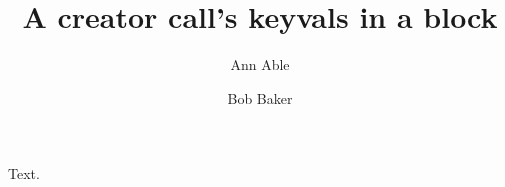 \documentclass{article}
\makeatletter
\providecommand\lx@add@creator[2][]{#2}
\makeatother
\begin{document}
\title{A creator call's keyvals in a block}
\makeatletter
\author{Ann Able \and \lx@add@creator[role=editor,name={Edited by},annotations={ed}]{Bob Baker}}
\makeatother
\maketitle
Text.
\end{document}
